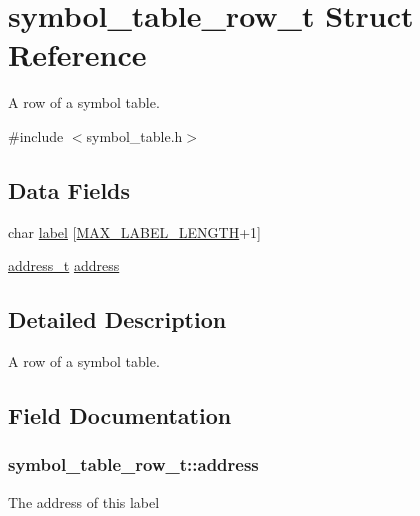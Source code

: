 \hypertarget{structsymbol__table__row__t}{}\section{symbol\+\_\+table\+\_\+row\+\_\+t Struct Reference}
\label{structsymbol__table__row__t}


A row of a symbol table.  




{\ttfamily \#include $<$symbol\+\_\+table.\+h$>$}

\subsection*{Data Fields}
\begin{DoxyCompactItemize}
\item 
char \hyperlink{structsymbol__table__row__t_ac71c7d088a4544f99669c495a558ff76}{label} \mbox{[}\hyperlink{global_8h_a40953fb1d014188b77bbf6d21d0b3e6c}{M\+A\+X\+\_\+\+L\+A\+B\+E\+L\+\_\+\+L\+E\+N\+G\+TH}+1\mbox{]}
\item 
\hyperlink{global_8h_a8f4b132f56a25431714862229639be12}{address\+\_\+t} \hyperlink{structsymbol__table__row__t_a02e1481d92dff625e76827cc8e6abb6a}{address}
\end{DoxyCompactItemize}


\subsection{Detailed Description}
A row of a symbol table. 

\subsection{Field Documentation}
\subsubsection[{\texorpdfstring{address}{address}}]{ symbol\+\_\+table\+\_\+row\+\_\+t\+::address}\hypertarget{structsymbol__table__row__t_a02e1481d92dff625e76827cc8e6abb6a}{}\label{structsymbol__table__row__t_a02e1481d92dff625e76827cc8e6abb6a}
The address of this label 
